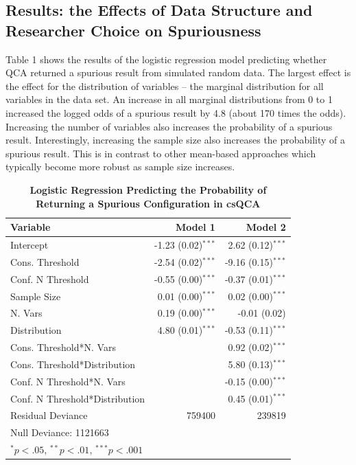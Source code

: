 \documentclass[]{article}
\begin{document}
\subsection{Results: the Effects of Data Structure and Researcher Choice on Spuriousness}

Table 1 shows the results of the logistic regression model predicting whether QCA returned a spurious result from simulated random data. The largest effect is the effect for the distribution of variables -- the marginal distribution for all variables in the data set. An increase in all marginal distributions from 0 to 1 increased the logged odds of a spurious result by 4.8 (about 170 times the odds). Increasing the number of variables also increases the probability of a spurious result. Interestingly, increasing the sample size also increases the probability of a spurious result. This is in contrast to other mean-based approaches which typically become more robust as sample size increases.



\begin{table}[ht]
\caption {\textbf{Logistic Regression Predicting the Probability of Returning a Spurious Configuration in csQCA}} \label{tab:title}
\begin{tabular}{lrr}
  \hline
 Variable & Model 1 & Model 2 \\ 
  \hline
  Intercept & -1.23 (0.02)$ ^{***}$ & 2.62 (0.12)$ ^{***}$    \\ 
  Cons. Threshold & -2.54 (0.02)$ ^{***}$ & -9.16 (0.15)$ ^{***}$ \\ 
  Conf. N Threshold & -0.55 (0.00)$ ^{***}$ & -0.37 (0.01)$ ^{***}$  \\ 
  Sample Size & 0.01 (0.00)$ ^{***}$ & 0.02 (0.00)$ ^{***}$  \\ 
  N. Vars & 0.19 (0.00)$ ^{***}$ & -0.01 (0.02) \\ 
  Distribution & 4.80 (0.01)$ ^{***}$ & -0.53 (0.11)$ ^{***}$  \\ 
  Cons. Threshold*N. Vars & & 0.92 (0.02)$ ^{***}$   \\ 
  Cons. Threshold*Distribution & & 5.80 (0.13)$ ^{***}$  \\ 
  Conf. N Threshold*N. Vars & & -0.15 (0.00)$ ^{***}$  \\ 
  Conf. N Threshold*Distribution & & 0.45 (0.01)$ ^{***}$  \\ 
  Residual Deviance &  759400 & 239819 \\
   \hline
 \multicolumn{2}{l}{\footnotesize{Null Deviance: 1121663}}\\
 \multicolumn{1}{l}{\footnotesize{$^{*}p < .05$, $ ^{**}p < .01 $,  $ ^{***}p < .001 $}}\\

\end{tabular}
\end{table}
\end{document}
